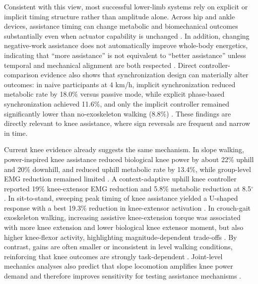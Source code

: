 \documentclass[lettersize,journal]{IEEEtran}
\begin{document}
Consistent with this view, most successful lower-limb systems rely on explicit or implicit timing structure rather than amplitude alone. Across hip and ankle devices, assistance timing can change metabolic and biomechanical outcomes substantially even when actuator capability is unchanged \cite{ding2016timing,galle2017ankle,grimmer2019comparison,lim2019tro}. In addition, changing negative-work assistance does not automatically improve whole-body energetics, indicating that ``more assistance'' is not equivalent to ``better assistance'' unless temporal and mechanical alignment are both respected \cite{malcolm2017negative}. Direct controller-comparison evidence also shows that synchronization design can materially alter outcomes: in naive participants at 4 km/h, implicit synchronization reduced metabolic rate by 18.0\% versus passive mode, while explicit phase-based synchronization achieved 11.6\%, and only the implicit controller remained significantly lower than no-exoskeleton walking (8.8\%) \cite{manzoori2024sync}. These findings are directly relevant to knee assistance, where sign reversals are frequent and narrow in time.

Current knee evidence already suggests the same mechanism. In slope walking, power-inspired knee assistance reduced biological knee power by about 22\% uphill and 20\% downhill, and reduced uphill metabolic rate by 13.4\%, while group-level EMG reduction remained limited \cite{park2020hingefree}. A context-adaptive uphill knee controller reported 19\% knee-extensor EMG reduction and 5.8\% metabolic reduction at 8.5$^\circ$ \cite{lee2023context}. In sit-to-stand, sweeping peak timing of knee assistance yielded a U-shaped response with a best 19.3\% reduction in knee-extensor activation \cite{choi2021timing}. In crouch-gait exoskeleton walking, increasing assistive knee-extension torque was associated with more knee extension and lower biological knee extensor moment, but also higher knee-flexor activity, highlighting magnitude-dependent trade-offs \cite{lerner2017crouch}. By contrast, gains are often smaller or inconsistent in level walking conditions, reinforcing that knee outcomes are strongly task-dependent \cite{mclean2019energetics}. Joint-level mechanics analyses also predict that slope locomotion amplifies knee power demand and therefore improves sensitivity for testing assistance mechanisms \cite{nuckols2020mechanics}.
\end{document}
